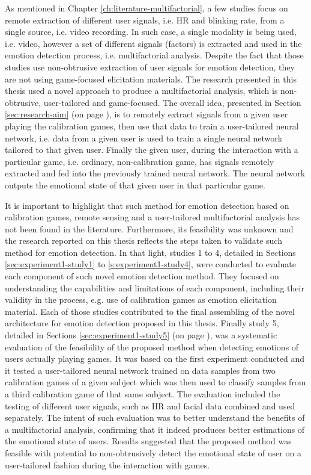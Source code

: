 As mentioned in Chapter \ref{ch:literature-multifactorial}, a few studies focus on remote extraction of different user signals, i.e. HR and blinking rate, from a single source, i.e. video recording. In such case, a single modality is being used, i.e. video, however a set of different signals (factors) is extracted and used in the emotion detection process, i.e. multifactorial analysis. Despite the fact that those studies use non-obtrusive extraction of user signals for emotion detection, they are not using game-focused elicitation materials. The research presented in this thesis used a novel approach to produce a multifactorial analysis, which is non-obtrusive, user-tailored and game-focused. The overall idea, presented in Section \ref{sec:research-aim} (on page \pageref{sec:research-aim}), is to remotely extract signals from a given user playing the calibration games, then use that data to train a user-tailored neural network, i.e. data from a given user is used to train a single neural network tailored to that given user. Finally the given user, during the interaction with a particular game, i.e. ordinary, non-calibration game, has signals remotely extracted and fed into the previously trained neural network. The neural network outputs the emotional state of that given user in that particular game.

It is important to highlight that such method for emotion detection based on calibration games, remote sensing and a user-tailored multifactorial analysis has not been found in the literature. Furthermore, its feasibility was unknown and the research reported on this thesis reflects the steps taken to validate such method for emotion detection. In that light, studies 1 to 4, detailed in Sections \ref{sec:experiment1-study1} to \ref{s:experiment1-study4}, were conducted to evaluate each component of such novel emotion detection method. They focused on understanding the capabilities and limitations of each component, including their validity in the process, e.g. use of calibration games as emotion elicitation material. Each of those studies contributed to the final assembling of the novel architecture for emotion detection proposed in this thesis. Finally study 5, detailed in Sections \ref{sec:experiment1-study5} (on page \pageref{sec:experiment1-study5}), was a systematic evaluation of the feasibility of the proposed method when detecting emotions of users actually playing games. It was based on the first experiment conducted and it tested a user-tailored neural network trained on data samples from two calibration games of a given subject which was then used to classify samples from a third calibration game of that same subject. The evaluation included the testing of different user signals, such as HR and facial data combined and used separately. The intent of such evaluation was to better understand the benefits of a multifactorial analysis, confirming that it indeed produces better estimations of the emotional state of users. Results suggested that the proposed method was feasible with potential to non-obtrusively detect the emotional state of user on a user-tailored fashion during the interaction with games.

